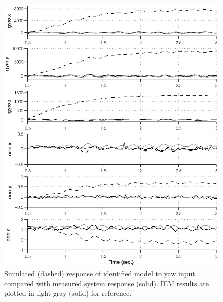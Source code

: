 \newpage
\begin{figure}[htb!]
	\centering
	\includegraphics{../fig/sim_1760_moesp.eps}
	\caption{Simulated (dashed) response of identified model to yaw input compared with measured system response (solid). IEM results are plotted in light gray (solid) for reference.}
\end{figure}\clearpage











